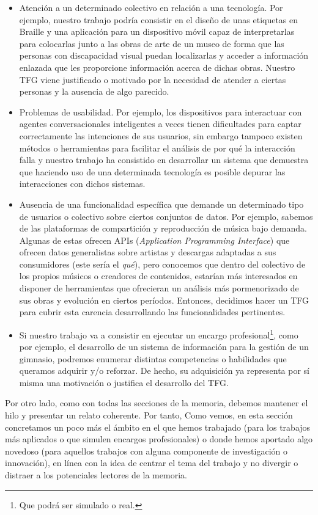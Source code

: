 \begin{itemize}
  \item Atención a un determinado colectivo en relación a una tecnología. Por ejemplo, nuestro trabajo podría consistir en el diseño de unas etiquetas en Braille y una aplicación para un dispositivo móvil capaz de interpretarlas para colocarlas junto a las obras de arte de un museo de forma que las personas con discapacidad visual puedan localizarlas y acceder a información enlazada que les proporcione información acerca de dichas obras. Nuestro TFG viene justificado o motivado por la necesidad de atender a ciertas personas y la ausencia de algo parecido.
  \item Problemas de usabilidad. Por ejemplo, los dispositivos para interactuar con agentes conversacionales inteligentes a veces tienen dificultades para captar correctamente las intenciones de sus usuarios, sin embargo tampoco existen métodos o herramientas para facilitar el análisis de por qué la interacción falla y nuestro trabajo ha consistido en desarrollar un sistema que demuestra que haciendo uso de una determinada tecnología es posible depurar las interacciones con dichos sistemas.
  \item Ausencia de una funcionalidad específica que demande un determinado tipo de usuarios o colectivo sobre ciertos conjuntos de datos. Por ejemplo, sabemos de las plataformas de compartición y reproducción de música bajo demanda. Algunas de estas ofrecen APIs (\textit{Application Programming Interface}) que ofrecen datos generalistas sobre artistas y descargas adaptadas a sus consumidores (este sería el \textit{qué}), pero conocemos que dentro del colectivo de los propios músicos o creadores de contenidos, estarían más interesados en disponer de herramientas que ofrecieran un análisis más pormenorizado de sus obras y evolución en ciertos períodos. Entonces, decidimos hacer un TFG para cubrir esta carencia desarrollando las funcionalidades pertinentes.
  \item Si nuestro trabajo va a consistir en ejecutar un encargo profesional\footnote{Que podrá ser simulado o real.}, como por ejemplo, el desarrollo de un sistema de información para la gestión de un gimnasio, podremos enumerar distintas competencias o habilidades que queramos adquirir y/o reforzar. De hecho, su adquisición ya representa por sí misma una motivación o justifica el desarrollo del TFG.
\end{itemize}

Por otro lado, como con todas las secciones de la memoria, debemos mantener el hilo y presentar un relato coherente. Por tanto, Como vemos, en esta sección concretamos un poco más el ámbito en el que hemos trabajado (para los trabajos más aplicados o que simulen encargos profesionales) o donde hemos aportado algo novedoso (para aquellos trabajos con alguna componente de investigación o innovación), en línea con la idea de centrar el tema del trabajo y no divergir o distraer a los potenciales lectores de la memoria.

